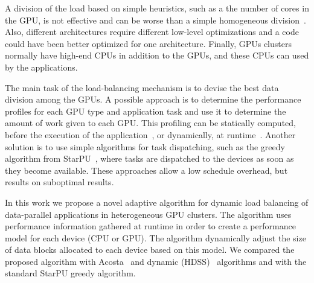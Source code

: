 \documentclass[journal]{IEEEtran}
\begin{document}
A division of the load based on simple heuristics, such as a the number of cores
in the GPU, is not effective and can be worse than a simple homogeneous
division~\cite{raphael}. Also, different architectures require different
low-level optimizations and a code could have been better optimized for one
architecture. Finally, GPUs clusters normally have high-end CPUs in addition to
the GPUs, and these CPUs can used by the applications.

%

The main task of the load-balancing mechanism is to devise the best data
division among the GPUs. A possible approach is to determine the performance
profiles for each GPU type and application task and use it to determine the
amount of work given to each GPU. This profiling can be statically computed, before the
execution of the application~\cite{raphael}, or dynamically, at runtime~\cite{acosta, HDSS}. Another solution is to use simple algorithms for
task dispatching, such as the greedy algorithm from StarPU~\cite{starpu}, where
tasks are dispatched to the devices as soon as they become available. These approaches allow a low schedule overhead, but results on suboptimal results.

In this work we propose a novel adaptive algorithm for dynamic load balancing of
data-parallel applications in heterogeneous GPU clusters. The algorithm uses
performance information gathered at runtime in order to create a performance model for each
device (CPU or GPU). The algorithm dynamically adjust the size of data blocks
allocated to each device based on this model. We compared the proposed algorithm
with Acosta~\cite{acosta} and dynamic (HDSS)~\cite{HDSS} algorithms and with
the standard StarPU greedy algorithm.

% 
% 
% 
% 
\end{document}
